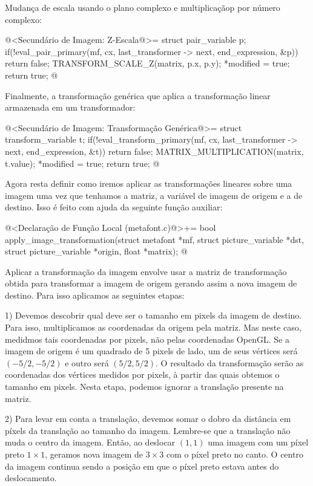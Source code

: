 {{{{{{Mudança de escala usando o plano complexo e multiplicaçãop por número
complexo:

\iniciocodigo
@<Secundário de Imagem: Z-Escala@>=
struct pair_variable p;
if(!eval_pair_primary(mf, cx, last_transformer -> next, end_expression, &p))
  return false;
TRANSFORM_SCALE_Z(matrix, p.x, p.y);
*modified = true;
return true;
@
\fimcodigo

Finalmente, a transformação genérica que aplica a transformação linear
armazenada em um transformador:

\iniciocodigo
@<Secundário de Imagem: Transformação Genérica@>=
struct transform_variable t;
if(!eval_transform_primary(mf, cx, last_transformer -> next, end_expression,
                           &t))
  return false;
MATRIX_MULTIPLICATION(matrix, t.value);
*modified = true;
return true;
@
\fimcodigo

Agora resta definir como iremos aplicar as transformações lineares
sobre uma imagem uma vez que tenhamos a matriz, a variável de imagem
de origem e a de destino. Isso é feito com ajuda da seguinte função
auxiliar:

\iniciocodigo
@<Declaração de Função Local (metafont.c)@>+=
bool apply_image_transformation(struct metafont *mf,
                                struct picture_variable *dst,
                                struct picture_variable *origin,
                                float *matrix);
@
\fimcodigo

Aplicar a transformação da imagem envolve usar a matriz de
transformação obtida para transformar a imagem de origem gerando assim
a nova imagem de destino. Para isso aplicamos as seguintes etapas:

1) Devemos descobrir qual deve ser o tamanho em pixels da imagem de
destino. Para isso, multiplicamos as coordenadas da origem pela
matriz. Mas neste caso, medidmos tais coordenadas por pixels, não
pelas coordenadas OpenGL. Se a imagem de origem é um quadrado de 5
pixels de lado, um de seus vértices será $(-5/2, -5/2)$ e outro será
$(5/2, 5/2)$. O resultado da transformação serão as coordenadas dos
vértices medidos por pixels, à partir das quais obtemos o tamanho em
pixels. Nesta etapa, podemos ignorar a translação presente na matriz.

2) Para levar em conta a translação, devemos somar o dobro da
distância em píxels da translação ao tamanho da imagem. Lembre-se que a
translação não muda o centro da imagem. Então, ao deslocar $(1, 1)$
uma imagem com um píxel preto $1\times 1$, geramos nova imagem de
$3\times 3$ com o píxel preto no canto. O centro da imagem continua
sendo a posição em que o píxel preto estava antes do deslocamento.

}}}}}}
